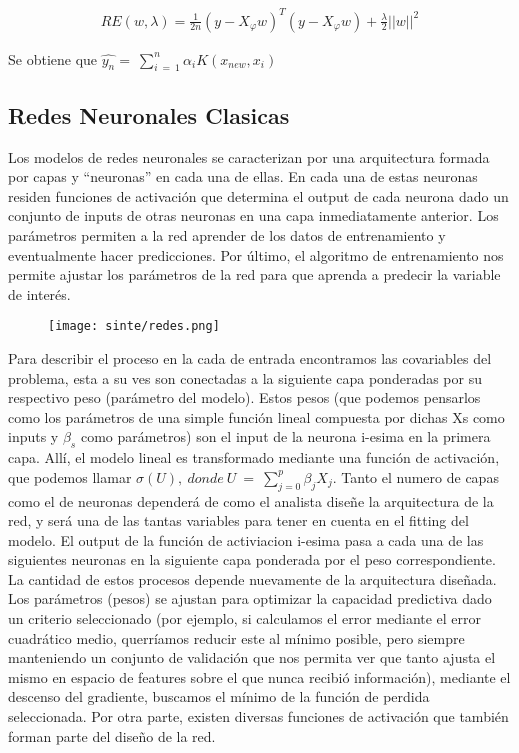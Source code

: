 \documentclass[12pt]{article}
\begin{document}
\begin{align*}
RE(w,\lambda) = \frac{1}{2n}(y - X_{\varphi}w)^{T}(y - X_{\varphi}w) + \frac{\lambda}{2}{||w||}^{2}
\end{align*}

Se obtiene que {$\widehat{y_n}=\ \sum_{i\ =\ 1}^{n}{\alpha_iK(x_{new},x_i)}$}

\subsection{Redes Neuronales Clasicas}

Los modelos de redes neuronales se caracterizan por una arquitectura formada por capas y “neuronas” en cada una de ellas. En cada una de estas neuronas residen funciones de activación que determina el output de cada neurona dado un conjunto de inputs de otras neuronas en una capa inmediatamente anterior. Los parámetros permiten a la red aprender de los datos de entrenamiento y eventualmente hacer predicciones. Por último, el algoritmo de entrenamiento nos permite ajustar los parámetros de la red para que aprenda a predecir la variable de interés. 

\begin{figure}[H]
\centering
\texttt{[image: sinte/redes.png]}
\end{figure}

Para describir el proceso en la cada de entrada encontramos las covariables del problema, esta a su ves son conectadas a la siguiente capa ponderadas por su respectivo peso (parámetro del modelo). Estos pesos (que podemos pensarlos como los parámetros de una simple función lineal compuesta por dichas Xs como inputs y {$\beta_s$} como parámetros) son el input de la neurona i-esima en la primera capa. Allí, el modelo lineal es transformado mediante una función de activación, que podemos llamar {$ \sigma(U),\ donde\ U\ =\ \sum_{j=0}^{p}{\beta_jX_j} $}. Tanto el numero de capas como el de neuronas dependerá de como el analista diseñe la arquitectura de la red, y será una de las tantas variables para tener en cuenta en el fitting del modelo. El output de la función de activiacion i-esima pasa a cada una de las siguientes neuronas en la siguiente capa ponderada por el peso correspondiente. La cantidad de estos procesos depende nuevamente de la arquitectura diseñada. 
Los parámetros (pesos) se ajustan para optimizar la capacidad predictiva dado un criterio seleccionado (por ejemplo, si calculamos el error mediante el error cuadrático medio, querríamos reducir este al mínimo posible, pero siempre manteniendo un conjunto de validación que nos permita ver que tanto ajusta el mismo en espacio de features sobre el que nunca recibió información), mediante el descenso del gradiente, buscamos el mínimo de la función de perdida seleccionada. Por otra parte, existen diversas funciones de activación que también forman parte del diseño de la red.
\pagebreak
\end{document}
